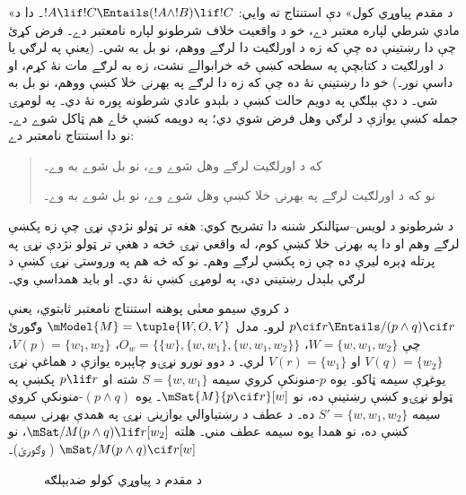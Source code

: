 \documentclass[../../../include/open-logic-section]{subfiles}
\begin{document}


«د مقدم پياوړي کول» دې استنتاج ته وايي:
$!A \lif !C \Entails (!A \land !B) \lif !C$۔ دا د مادي
شرطي لپاره معتبر دے، خو د واقعيت خلاف شرطونو لپاره نامعتبر
دے۔ فرض کړئ چې دا رښتينې ده چې که زه د اورلګيت دا لرګے ووهم،
نو بل به شي۔ (يعنې په لرګي يا د اورلګيت د کتابچې په سطحه کښې
څه خرابوالے نشت، زه به لرګے مات نۀ کړم، او داسې نور۔) خو دا
رښتينې نۀ ده چې که زه دا لرګے په بهرنۍ خلا کښې ووهم، نو بل
به شي۔ د دې بېلګې په دويم حالت کښې د بلېدو عادي شرطونه
پوره نۀ دي۔ په لومړۍ جمله کښې يوازې د لرګي وهل فرض شوي دي؛
په دويمه کښې ځاے هم ټاکل شوے دے۔ نو دا
استنتاج نامعتبر دے:
\begin{quote}
  که د اورلګيت لرګے وهل شوے وے، نو بل شوے به وے۔

  نو که د اورلګيت لرګے په بهرنۍ خلا کښې وهل شوے وے، نو بل شوے به وے۔
\end{quote}

د شرطونو د لويس--سټالنکر شننه دا تشريح کوي: هغه تر ټولو
نژدې نړۍ چې زه پکښې لرګے وهم او دا په بهرنۍ خلا کښې کوم،
له واقعي نړۍ څخه د هغې تر ټولو نژدې نړۍ په پرتله ډېره ليرې
ده چې زه پکښې لرګے وهم۔ نو که څه هم په وروستۍ نړۍ کښې د
لرګي بلېدل رښتيني دي، په لومړۍ کښې نۀ دي۔ او بايد همداسې وي۔

\begin{ex}
  د کروي سيمو معنٰی پوهنه استنتاج نامعتبر ثابتوي، يعنې $p
  \cif r \Entails/ (p \land q) \cif r$ لرو۔ مدل $\mModel{M}
  = \tuple{W, O, V}$ وګورئ چې $W = \{w, w_1, w_2\}$، $O_w = \{\{w\}, \{w,
  w_1\}, \{w, w_1, w_2\}\}$، $V(p) = \{w_1, w_2\}$، $V(q) = \{w_2\}$
  او $V(r) = \{w_1\}$ لري۔ د دوو نورو نړۍو چاپېره يوازې د
  هماغې نړۍ يوغړې سيمه ټاکو۔ يوه $p$-منونکې کروي سيمه $S = \{w,
  w_1\}$ شته او $p \lif r$ پکښې په ټولو نړۍو کښې رښتينې ده،
  نو $\mSat{M}{p
    \cif r}[w]$۔ يوه $(p \land q)$-منونکې کروي سيمه $S' =
  \{w, w_1, w_2\}$ ده۔ د عطف د رښتياوالي يوازينۍ نړۍ په
  همدې بهرنۍ سيمه کښې ده، نو همدا يوه سيمه عطف مني۔ هلته
  $\mSat/{M}{(p \land q) \lif r}[w_2]$، نو
  $\mSat/{M}{(p \land q) \cif r}[w]$
  ( وګورئ)۔

\begin{figure}
\begin{center}
\caption{د مقدم د پياوړي کولو ضدبېلګه}
\end{center}
\end{figure}
\end{ex}
\end{document}
